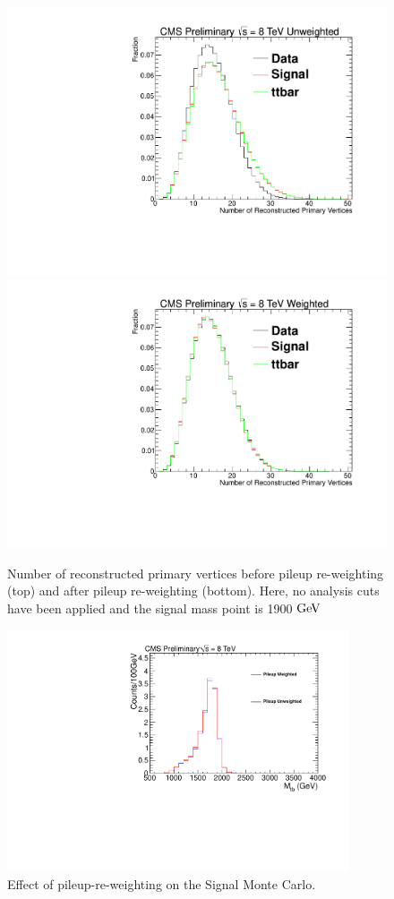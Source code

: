 \begin{figure}
\begin{center}
\includegraphics[width=0.7\linewidth]{AN-13-004/figs/npvuw.pdf}\\
\includegraphics[width=0.7\linewidth]{AN-13-004/figs/npvw.pdf}
\end{center}
\caption{Number of reconstructed primary vertices before pileup re-weighting (top) and after pileup re-weighting (bottom).  Here, no analysis cuts have been applied and the signal mass point is 1900$~\mathrm{GeV}$}
\label{figs:npvweight}
\end{figure}

\begin{figure}[htcb]
\centering
\includegraphics[width=0.9\textwidth]{AN-13-004/figs/Signal_M1900_PileupComp.pdf}
\caption{Effect of pileup-re-weighting on the Signal Monte Carlo.}
\label{figs:pileup3}
\end{figure}

